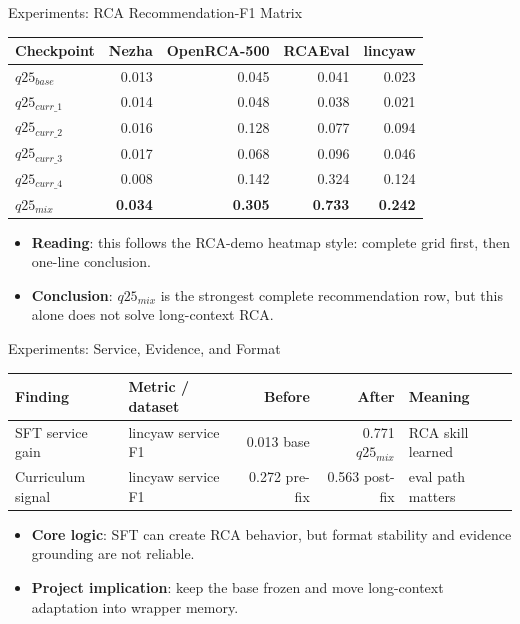 \begin{frame}{Experiments: RCA Recommendation-F1 Matrix}
  \tiny
  \begin{table}
    \begin{tabular}{lrrrr}
      \toprule
      Checkpoint & Nezha & OpenRCA-500 & RCAEval & lincyaw \\
      \midrule
      $q25_{base}$ & 0.013 & 0.045 & 0.041 & 0.023 \\
      $q25_{curr\_1}$ & 0.014 & 0.048 & 0.038 & 0.021 \\
      $q25_{curr\_2}$ & 0.016 & 0.128 & 0.077 & 0.094 \\
      $q25_{curr\_3}$ & 0.017 & 0.068 & 0.096 & 0.046 \\
      $q25_{curr\_4}$ & 0.008 & 0.142 & 0.324 & 0.124 \\
      $q25_{mix}$ & \textbf{0.034} & \textbf{0.305} & \textbf{0.733} & \textbf{0.242} \\
      \bottomrule
    \end{tabular}
  \end{table}
  \normalsize
  \vspace{-0.4em}
  \begin{itemize}
    \item \textbf{Reading}: this follows the RCA-demo heatmap style: complete grid first, then one-line conclusion.
    \item \textbf{Conclusion}: $q25_{mix}$ is the strongest complete recommendation row, but this alone does not solve long-context RCA.
  \end{itemize}
\end{frame}

\begin{frame}{Experiments: Service, Evidence, and Format}
  \scriptsize
  \begin{table}
    \begin{tabular}{p{} p{} r r p{}}
      \toprule
      Finding & Metric / dataset & Before & After & Meaning \\
      \midrule
      SFT service gain & lincyaw service F1 & 0.013 base & 0.771 $q25_{mix}$ & RCA skill learned \\
      Curriculum signal & lincyaw service F1 & 0.272 pre-fix & 0.563 post-fix & eval path matters \\
      \bottomrule
    \end{tabular}
  \end{table}
  \begin{itemize}
    \item \textbf{Core logic}: SFT can create RCA behavior, but format stability and evidence grounding are not reliable.
    \item \textbf{Project implication}: keep the base frozen and move long-context adaptation into wrapper memory.
  \end{itemize}
\end{frame}

